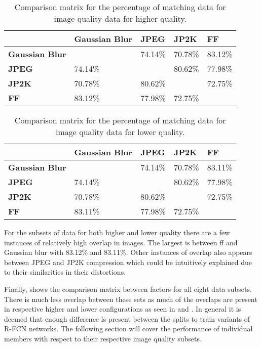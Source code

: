 \documentclass[a4paper,twoside]{article}
\begin{document}
\begin{table}[h]
\centering
\caption{Comparison matrix for the percentage of matching data for image quality data for higher quality.}
\label{tab:highcomp}
\begin{tabular}{|l|l|l|l|l|}
\hline
             & \textbf{Gaussian Blur}  & \textbf{JPEG} & \textbf{JP2K} & \textbf{FF}    \\ \hline
\textbf{Gaussian Blur} &                & 74.14\% & 70.78\% & 83.12\% \\ \hline
\textbf{JPEG}   & 74.14\% &                & 80.62\% & 77.98\% \\ \hline
\textbf{JP2K}   & 70.78\%  & 80.62\% &                & 72.75\% \\ \hline
\textbf{FF}   & 83.12\% & 77.98\% & 72.75\% &                \\ \hline
\end{tabular}
\end{table}

\begin{table}[h]
\centering
\caption{Comparison matrix for the percentage of matching data for image quality data for lower quality.}
\label{tab:lowcomp}
\begin{tabular}{|l|l|l|l|l|}
\hline
             & \textbf{Gaussian Blur}  & \textbf{JPEG} & \textbf{JP2K} & \textbf{FF}     \\ \hline
\textbf{Gaussian Blur}  &                & 74.14\%   & 70.78\% & 83.11\% \\ \hline
\textbf{JPEG}    & 74.14\% &                & 80.62\% & 77.98\% \\ \hline
\textbf{JP2K}   & 70.78\% & 80.62\% &                & 72.75\% \\ \hline
\textbf{FF}  & 83.11\% & 77.98\% & 72.75\% &                \\ \hline
\end{tabular}
\end{table}

For the subsets of data for both higher and lower quality there are a few instances of relatively high overlap in images. The largest is between \gls{ff} and Gaussian blur with 83.12\% and 83.11\%. Other instances of overlap also appears between JPEG and JP2K compression which could be intuitively explained due to their similarities in their distortions. 

Finally,  shows the comparison matrix between factors for all eight data subsets. There is much less overlap between these sets as much of the overlaps are present in respective higher and lower configurations as seen in  and . In general it is deemed that enough difference is present between the splits to train variants of R-FCN networks. The following section will cover the performance of individual members with respect to their respective image quality subsets.
\end{document}

